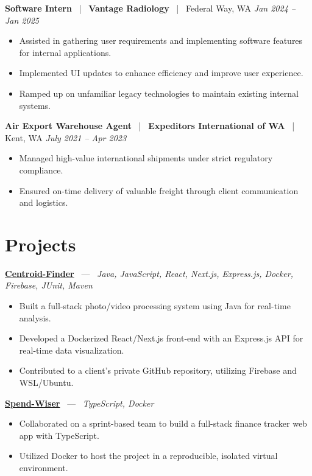 \documentclass[10pt, letterpaper]{article}
\newcommand{\jobhead}[4]{%
  \vspace{5pt}%
  {\bfseries\color{dark}#1}%
  ~{\color{light}|}~%
  {\bfseries\color{navy}#2}%
  ~{\color{light}|}~%
  {\color{light}#3}%
  \hfill{\color{light}\small\textit{#4}}\\[-2pt]%
}
\newcommand{\projhead}[3]{%
  \vspace{5pt}%
  {\bfseries\color{dark}\href{#2}{#1}}%
  ~{\color{light}---}~%
  {\color{light}\small\textit{#3}}\\[-2pt]%
}
\begin{document}
\jobhead{Software Intern}{Vantage Radiology}{Federal Way, WA}{Jan 2024 – Jan 2025}
\begin{itemize}
  \item Assisted in gathering user requirements and implementing software features for internal applications.
  \item Implemented UI updates to enhance efficiency and improve user experience.
  \item Ramped up on unfamiliar legacy technologies to maintain existing internal systems.
\end{itemize}

\jobhead{Air Export Warehouse Agent}{Expeditors International of WA}{Kent, WA}{July 2021 – Apr 2023}
\begin{itemize}
  \item Managed high-value international shipments under strict regulatory compliance.
  \item Ensured on-time delivery of valuable freight through client communication and logistics.
\end{itemize}

\section{Projects}

\projhead{Centroid-Finder}{https://github.com/xavierb117/centroid-finder}{Java, JavaScript, React, Next.js, Express.js, Docker, Firebase, JUnit, Maven}
\begin{itemize}
  \item Built a full-stack photo/video processing system using Java for real-time analysis.
  \item Developed a Dockerized React/Next.js front-end with an Express.js API for real-time data visualization.
  \item Contributed to a client's private GitHub repository, utilizing Firebase and WSL/Ubuntu.
\end{itemize}

\projhead{Spend-Wiser}{https://github.com/JesseChum/w26-sdev372-spendwiser-finance-tracker}{TypeScript, Docker}
\begin{itemize}
  \item Collaborated on a sprint-based team to build a full-stack finance tracker web app with TypeScript.
  \item Utilized Docker to host the project in a reproducible, isolated virtual environment.
\end{itemize}
\end{document}
